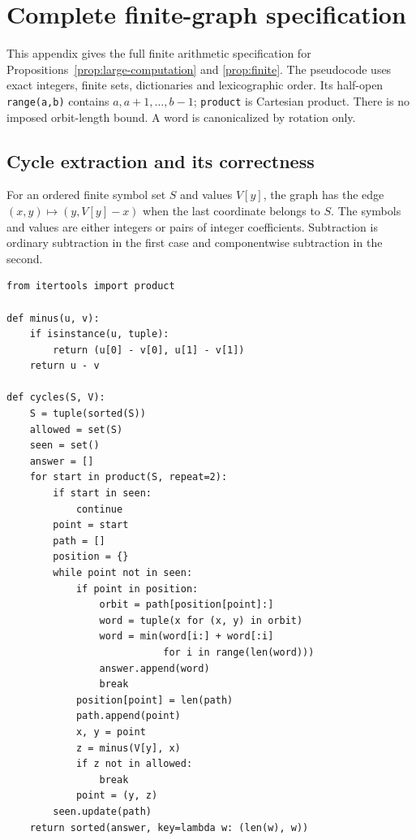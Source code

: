 \section{Complete finite-graph specification}
\label{app:certificate}

This appendix gives the full finite arithmetic specification for
Propositions~\ref{prop:large-computation} and \ref{prop:finite}.
The pseudocode uses exact integers, finite sets, dictionaries and
lexicographic order. Its half-open \texttt{range(a,b)} contains
$a,a+1,\ldots,b-1$; \texttt{product} is Cartesian product.
There is no imposed orbit-length bound. A word is canonicalized by
rotation only.

\subsection{Cycle extraction and its correctness}

For an ordered finite symbol set $S$ and values $V[y]$, the graph
has the edge $(x,y)\mapsto(y,V[y]-x)$ when the last coordinate
belongs to $S$. The symbols and values are either integers or pairs
of integer coefficients. Subtraction is ordinary subtraction in the
first case and componentwise subtraction in the second.

\begin{Verbatim}[fontsize=\footnotesize]
from itertools import product

def minus(u, v):
    if isinstance(u, tuple):
        return (u[0] - v[0], u[1] - v[1])
    return u - v

def cycles(S, V):
    S = tuple(sorted(S))
    allowed = set(S)
    seen = set()
    answer = []
    for start in product(S, repeat=2):
        if start in seen:
            continue
        point = start
        path = []
        position = {}
        while point not in seen:
            if point in position:
                orbit = path[position[point]:]
                word = tuple(x for (x, y) in orbit)
                word = min(word[i:] + word[:i]
                           for i in range(len(word)))
                answer.append(word)
                break
            position[point] = len(path)
            path.append(point)
            x, y = point
            z = minus(V[y], x)
            if z not in allowed:
                break
            point = (y, z)
        seen.update(path)
    return sorted(answer, key=lambda w: (len(w), w))
\end{Verbatim}

